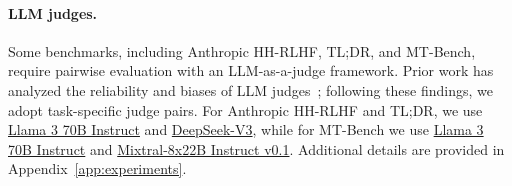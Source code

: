 \documentclass{article}
\theoremstyle{plain}
\theoremstyle{definition}
\theoremstyle{remark}
\begin{document}








\paragraph{LLM judges.}
Some benchmarks, including Anthropic HH-RLHF, TL;DR, and MT-Bench, require pairwise evaluation with an LLM-as-a-judge framework. Prior work has analyzed the reliability and biases of LLM judges~\cite{zhang2025compassjudger2generalistjudgemodel, han2025judgesverdictcomprehensiveanalysis}; following these findings, we adopt task-specific judge pairs. For Anthropic HH-RLHF and TL;DR, we use \href{https://huggingface.co/meta-llama/Meta-Llama-3-70B-Instruct}{Llama 3 70B Instruct} and \href{https://huggingface.co/deepseek-ai/DeepSeek-V3}{DeepSeek-V3}, while for MT-Bench we use \href{https://huggingface.co/meta-llama/Meta-Llama-3-70B-Instruct}{Llama 3 70B Instruct} and \href{https://huggingface.co/mistralai/Mixtral-8x22B-Instruct-v0.1}{Mixtral-8x22B Instruct v0.1}. Additional details are provided in Appendix~\ref{app:experiments}.
\end{document}
